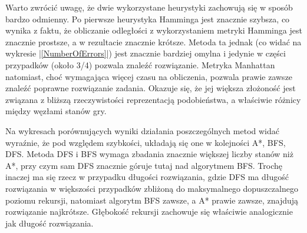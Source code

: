\documentclass{classrep}
\begin{document}
{{            Warto zwrócić uwagę, że dwie wykorzystane heurystyki zachowują się w sposób bardzo
            odmienny. Po pierwsze heurystyka Hamminga jest znacznie szybsza, co wynika z faktu,
            że obliczanie odległości z wykorzystaniem metryki Hamminga jest znacznie prostsze,
            a w rezultacie znacznie krótsze. Metoda ta jednak (co widać na wykresie |\ref{NumberOfErrors}|)
            jest znacznie bardziej omylna i jedynie w części przypadków (około 3/4) pozwala znaleźć
            rozwiązanie. Metryka Manhattan natomiast, choć wymagająca więcej czasu na obliczenia,
            pozwala prawie zawsze znaleźć poprawne rozwiązanie zadania. Okazuje się, że jej większa
            złożoność jest związana z bliższą rzeczywistości reprezentacją podobieństwa, a właściwie
            różnicy między węzłami stanów gry.
        }

        Na wykresach porównujących wyniki działania poszczególnych metod widać wyraźnie, że pod
        względem szybkości, układają się one w kolejności A*, BFS, DFS. Metoda DFS i BFS wymaga
        zbadania znacznie większej liczby stanów niż A*, przy czym sam DFS znacznie góruje tutaj
        nad algorytmem BFS. Trochę inaczej ma się rzecz w przypadku długości rozwiązania, gdzie
        DFS ma długość rozwiązania w większości przypadków zbliżoną do maksymalnego dopuszczalnego
        poziomu rekursji, natomiast algorytm BFS zawsze, a A* prawie zawsze, znajdują rozwiązanie
        najkrótsze. Głębokość rekursji zachowuje się właściwie analogicznie jak długość rozwiązania.

    }
\end{document}
